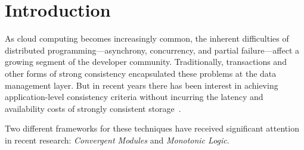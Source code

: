 \section{Introduction}
\label{sec:intro}
As cloud computing becomes increasingly common, the inherent difficulties of
distributed programming---asynchrony, concurrency, and partial failure---affect
a growing segment of the developer community.  Traditionally, transactions and
other forms of strong consistency encapsulated these problems at the data
management layer.  But in recent years there has been interest in achieving
application-level consistency criteria without incurring the latency and
availability costs of strongly consistent storage~\cite{Birman2009,Helland2009}.

% 
Two different frameworks for these techniques have received significant
attention in recent research: \emph{Convergent Modules} and \emph{Monotonic
  Logic}.


